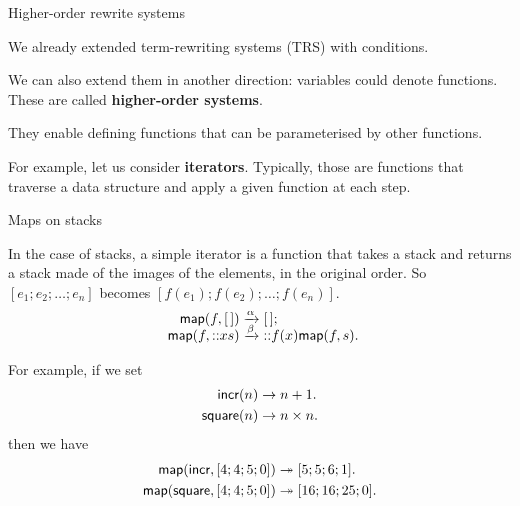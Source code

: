 %
\begin{frame}{Higher-order rewrite systems}

  We already extended term-rewriting systems (TRS) with conditions.

  \bigskip

  We can also extend them in another direction: variables could denote
  functions. These are called \textbf{higher\hyp{}order systems}.

  \bigskip

  They enable defining functions that can be parameterised by other
  functions.

  \bigskip

  For example, let us consider \textbf{iterators}. Typically, those
  are functions that traverse a data structure and apply a given
  function at each step.

\end{frame}

%
\begin{frame}{Maps on stacks}

  In the case of stacks, a simple iterator is a function 
  that takes a stack and returns a stack made of the images of the
  elements, in the original order. So $[e_1; e_2; \ldots; e_n]$ becomes $[f(e_1);
    f(e_2); \ldots; f(e_n)]$.
  \begin{equation*}
    \begin{array}{r@{\;}c@{\;}l@{}}
      \fun{map}(f, \el) &\smashedrightarrow{\alpha} & \el;\\
      \fun{map}(f, \cons{x}{s}) &\smashedrightarrow{\beta}
      & \cons{f(x)}{\fun{map}(f, s)}.
    \end{array}
  \end{equation*}

  For example, if we set
  \begin{align*}
    \textsf{incr}(n)   &\rightarrow n + 1.\\
    \textsf{square}(n) &\rightarrow n \times n.
  \end{align*}
  then we have
  \begin{align*}
    \textsf{map}(\textsf{incr}, [4; 4; 5; 0]) &\twoheadrightarrow [5; 5; 6; 1].\\
    \textsf{map}(\textsf{square}, [4; 4; 5; 0]) &\twoheadrightarrow [16; 16; 25; 0].
  \end{align*}

\end{frame}

